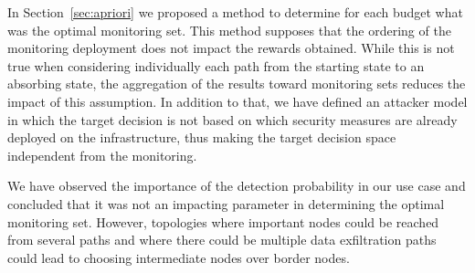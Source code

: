 In Section~\ref{sec:apriori} we proposed a method to determine for each budget what was the optimal monitoring set.
This method supposes that the ordering of the monitoring deployment does not impact the rewards obtained.
While this is not true when considering individually each path from the starting state to an absorbing state, the aggregation of the results toward monitoring sets reduces the impact of this assumption.
In addition to that, we have defined an attacker model in which the target decision is not based on which security measures are already deployed on the infrastructure, thus making the target decision space independent from the monitoring.

We have observed the importance of the detection probability in our use case and concluded that it was not an impacting parameter in determining the optimal monitoring set.
However, topologies where important nodes could be reached from several paths and where there could be multiple data exfiltration paths could lead to choosing intermediate nodes over border nodes.